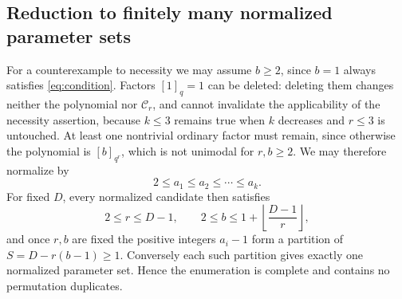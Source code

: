 \documentclass[11pt]{article}
\theoremstyle{research}
\theoremstyle{definition}
\newcommand{\qi}[1]{[#1]_q}
\newcommand{\qir}[2]{[#1]_{q^{#2}}}
\newcommand{\floor}[1]{\left\lfloor #1\right\rfloor}
\numberwithin{equation}{section}
\begin{document}
\subsection{Reduction to finitely many normalized parameter sets}
For a counterexample to necessity we may assume $b\ge2$, since $b=1$
always satisfies \eqref{eq:condition}. Factors $\qi1=1$ can be deleted:
deleting them changes neither the polynomial nor $\mathcal C_r$, and cannot
invalidate the applicability of the necessity assertion, because $k\le3$
remains true when $k$ decreases and $r\le3$ is untouched.
At least one nontrivial ordinary factor must remain, since otherwise the
polynomial is $\qir br$, which is not unimodal for $r,b\ge2$. We may
therefore normalize by
\[
 2\le a_1\le a_2\le\cdots\le a_k .
\]
For fixed $D$, every normalized candidate then satisfies
\begin{equation}\label{eq:finite-bounds}
 2\le r\le D-1,\qquad
 2\le b\le1+\floor{\frac{D-1}{r}},
\end{equation}
and once $r,b$ are fixed the positive integers $a_i-1$ form a partition of
$S=D-r(b-1)\ge1$. Conversely each such partition gives exactly one
normalized parameter set. Hence the enumeration is complete and contains
no permutation duplicates.
\end{document}
